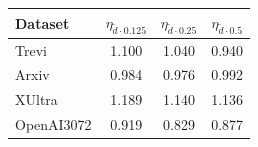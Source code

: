 \begin{tabular}{@{}lccc@{}}
\toprule
Dataset & $\eta_{\tilde{d}\cdot0.125}$ & $\eta_{\tilde{d}\cdot0.25}$ & $\eta_{\tilde{d}\cdot0.5}$ \\
\midrule
Trevi & 1.100 & 1.040 & 0.940 \\
Arxiv & 0.984 & 0.976 & 0.992 \\
XUltra & 1.189 & 1.140 & 1.136 \\
OpenAI3072 & 0.919 & 0.829 & 0.877 \\
\bottomrule
\end{tabular}
